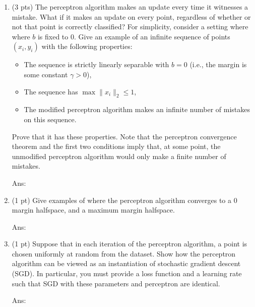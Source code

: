 \documentclass[10pt,letter,notitlepage]{article}
\newcommand{\red}[1]{{\color{red}#1}}
\newcommand{\ans}[1]{{\color{orange}\textsf{Ans}: #1}}
\newcounter{exercise}
\begin{document}
\begin{exercise}
  \begin{enumerate}
    \item (3 pts) The perceptron algorithm makes an update every time it witnesses a mistake.
      What if it makes an update on every point, regardless of whether or not that point is correctly classified? 
      For simplicity, consider a setting where where $b$ is fixed to $0$.
      Give an example of an infinite sequence of points $(x_i, y_i)$ with the following properties:
    \begin{itemize}
      \item The sequence is strictly linearly separable with $b = 0$ (i.e., the margin is some constant $\gamma > 0$),
      \item The sequence has $\max \|x_i\|_2 \leq 1$,
      \item The modified perceptron algorithm makes \red{an infinite number of mistakes on this sequence}. 
    \end{itemize}
    Prove that it has these properties.
      Note that the perceptron convergence theorem and the first two conditions imply that, at some point, the unmodified perceptron algorithm would only make a finite number of mistakes.

\ans{}

  \item (1 pt) Give examples of where the perceptron algorithm converges to a 0 margin halfspace, and a maximum margin halfspace.
    
\ans{} 
  \item (1 pt) Suppose that in each iteration of the perceptron algorithm, a point is chosen uniformly at random from the dataset.
    Show how the perceptron algorithm can be viewed as an instantiation of stochastic gradient descent (SGD). 
      In particular, you must provide a loss function and a learning rate such that SGD with these parameters and perceptron are identical. 

      \ans{} 
  \end{enumerate}
\end{exercise}
\end{document}
